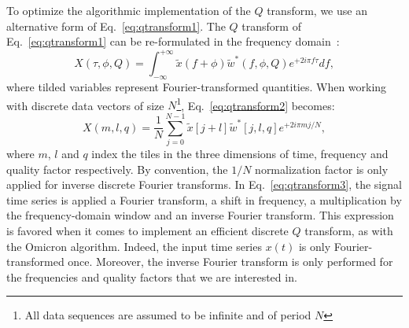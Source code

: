 To optimize the algorithmic implementation of the $Q$ transform, we use an alternative form of Eq.~\ref{eq:qtransform1}. The $Q$ transform of Eq.~\ref{eq:qtransform1} can be re-formulated in the frequency domain~\cite{Chatterji:2004}:
\begin{equation}
  X(\tau, \phi, Q) = \int_{-\infty}^{+\infty}{ \tilde{x}(f+\phi) \tilde{w}^{*}(f,\phi,Q) e^{+2i\pi f \tau}df},
  \label{eq:qtransform2}
\end{equation}
where tilded variables represent Fourier-transformed quantities. When working with discrete data vectors of size $N$\footnote{All data sequences are assumed to be infinite and of period $N$}, Eq.~\ref{eq:qtransform2} becomes:
\begin{equation}
  X(m,l,q) = \frac{1}{N}\sum_{j=0}^{N-1}{\tilde{x}[j+l]\tilde{w}^{*}[j,l,q]e^{+2i\pi mj/N}},
  \label{eq:qtransform3}
\end{equation}
where $m$, $l$ and $q$ index the tiles in the three dimensions of time, frequency and quality factor respectively. By convention, the $1/N$ normalization factor is only applied for inverse discrete Fourier transforms. In Eq.~\ref{eq:qtransform3}, the signal time series is applied a Fourier transform, a shift in frequency, a multiplication by the frequency-domain window and an inverse Fourier transform. This expression is favored when it comes to implement an efficient discrete $Q$ transform, as with the Omicron algorithm. Indeed, the input time series $x(t)$ is only Fourier-transformed once. Moreover, the inverse Fourier transform is only performed for the frequencies and quality factors that we are interested in.

